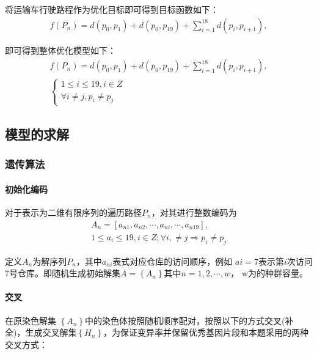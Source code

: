 \documentclass{whutmod}
\begin{document}
	    将运输车行驶路程作为优化目标即可得到目标函数如下：
	    \begin{gather*}
	    f(P_n)=d(p_0,p_{1})+d(p_0,p_{19})+\sum_{i=1}^{18}d(p_i,p_{i+1}) ,
	    \end{gather*}
	    
	    即可得到整体优化模型如下：
	    \begin{gather}
	    f(P_n)=d(p_0,p_{1})+d(p_0,p_{19})+\sum_{i=1}^{18}d(p_i,p_{i+1}) ,\\
	    \left\{\begin{matrix}1\leqslant i \leqslant 19 ,i\in Z
	    \\ \forall i \neq j,p_i \neq p_j 
	    \end{matrix}\right.
        \end{gather}
        
        \subsection{模型的求解}
        \subsubsection{遗传算法}
        \paragraph{初始化编码}
        对于表示为二维有限序列的遍历路径$P_n$，对其进行整数编码为
        \begin{gather*}
        A_n=[a_{n1},a_{n2},\cdots,a_{ni},\cdots,a_{n19}], \\
        1\leqslant a_i \leqslant 19 ,i\in Z ;\forall i, \neq j\Rightarrow p_i \neq p_j 
        \end{gather*}
        
        定义$A_n$为解序列$P_{n}$，其中$a_{ni}$表式对应仓库的访问顺序，例如 $a{i}=7$表示第$i$次访问7号仓库。即随机生成初始解集$A=\left \{A_n\right \}$其中$n=1,2,\cdots,w$， w为的种群容量。
        
        \paragraph{交叉}
        在原染色解集 $\left \{ A_n \right \}$中的染色体按照随机顺序配对，按照以下的方式交叉(补全)，生成交叉解集$\left \{H_n\right \}$，为保证变异率并保留优秀基因片段和本题采用的两种交叉方式：
        
\end{document}
